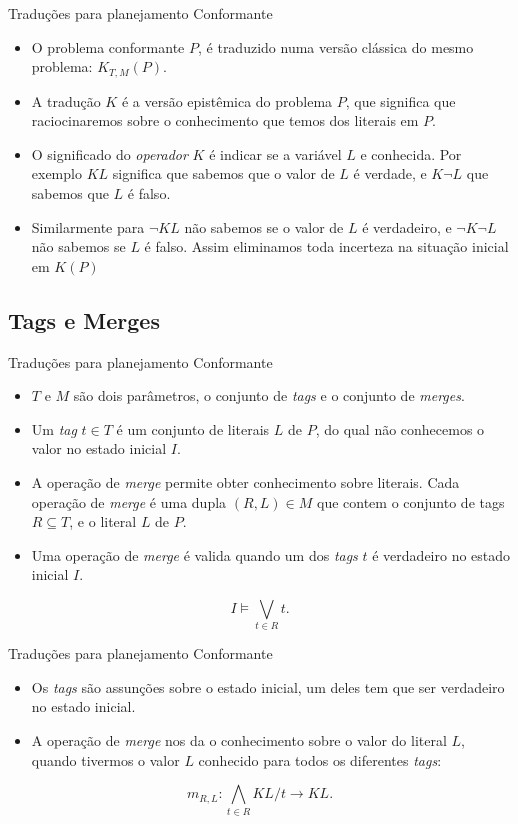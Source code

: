 \begin{frame}{Traduções para planejamento Conformante}
\begin{itemize}
\item O problema conformante $P$, é traduzido numa versão clássica do mesmo 
problema: $K_{T,M}(P)$. 
\item A tradução $K$ é a versão epistêmica do problema $P$, que significa que 
raciocinaremos sobre o conhecimento que temos dos literais em $P$.
\item O significado do \textit{operador} $K$ é indicar se a variável $L$ e 
conhecida. Por exemplo $KL$ significa que sabemos que o valor de $L$ é verdade, 
e $K \lnot L$ que sabemos que $L$ é falso.
\item Similarmente para $\lnot KL$ não sabemos se o valor de $L$ é verdadeiro, e 
$\lnot K \lnot L$ não sabemos se $L$ é falso. Assim eliminamos toda incerteza na 
situação inicial em $K(P)$ %
\end{itemize}  
\end{frame}

\subsection{Tags e Merges}
\begin{frame}{Traduções para planejamento Conformante}
\begin{itemize}
\item $T$ e $M$ são dois parâmetros, o conjunto de \textit{tags} e o conjunto de 
\textit{merges}. 
\item Um \textit{tag} $t \in T$ é um conjunto de literais $L$ de $P$, do qual 
não conhecemos o valor no estado inicial $I$. 
\item A operação de \textit{merge} permite obter conhecimento sobre literais. 
Cada operação de \textit{merge} é uma dupla $(R,L) \in M$ que contem o conjunto 
de tags $R \subseteq T$, e o literal $L$ de $P$. 
\item Uma operação de \textit{merge} é valida quando um dos \textit{tags} $t$ é 
verdadeiro no estado inicial $I$. 
\end{itemize}
\begin{equation*}
I \models \bigvee_{t \in R} t.
\end{equation*}
\end{frame}

\begin{frame}{Traduções para planejamento Conformante}
\begin{itemize}
\item Os \textit{tags} são assunções sobre o estado inicial, um deles tem que 
ser verdadeiro no estado inicial.
\item A operação de \textit{merge} nos da o conhecimento sobre o valor do 
literal $L$, quando tivermos o valor $L$ conhecido para todos os diferentes 
\textit{tags}:
\end{itemize}
\begin{equation*}
m_{R,L} : \bigwedge_{t \in R} KL/t \rightarrow KL.
\end{equation*}
\end{frame}

